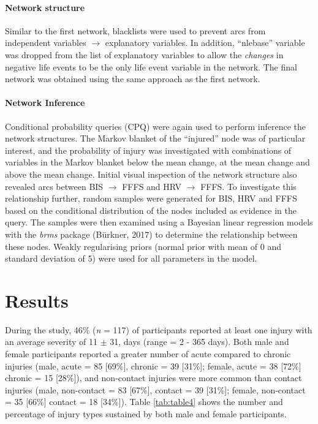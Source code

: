\documentclass[
  english,
  man,floatsintext]{apa6}
\let\oldparagraph\paragraph
\renewcommand{\paragraph}[1]{\oldparagraph{#1}\mbox{}}
\begin{document}
\hypertarget{network-structure-1}{%
\paragraph{Network structure}\label{network-structure-1}}

Similar to the first network, blacklists were used to prevent arcs from independent variables \(\rightarrow\) explanatory variables.
In addition, ``nlebase'' variable was dropped from the list of explanatory variables to allow the \emph{changes} in negative life events to be the only life event variable in the network.
The final network was obtained using the same approach as the first network.

\hypertarget{network-inference-1}{%
\paragraph{Network Inference}\label{network-inference-1}}

Conditional probability queries (CPQ) were again used to perform inference the network structures.
The Markov blanket of the ``injured'' node was of particular interest, and the probability of injury was investigated with combinations of variables in the Markov blanket below the mean change, at the mean change and above the mean change.
Initial visual inspection of the network structure also revealed arcs between BIS \(\rightarrow\) FFFS and HRV \(\rightarrow\) FFFS.
To investigate this relationship further, random samples were generated for BIS, HRV and FFFS based on the conditional distribution of the nodes included as evidence in the query.
The samples were then examined using a Bayesian linear regression models with the \emph{brms} package (Bürkner, 2017) to determine the relationship between these nodes.
Weakly regularising priors (normal prior with mean of 0 and standard deviation of 5) were used for all parameters in the model.

\hypertarget{results}{%
\section{Results}\label{results}}

During the study, 46\% (\emph{n} = 117) of participants reported at least one injury with an average severity of 11 \(\pm\) 31, days (range = 2 - 365 days).
Both male and female participants reported a greater number of acute compared to chronic injuries (male, acute = 85 {[}69\%{]}, chronic = 39 {[}31\%{]}; female, acute = 38 {[}72\%{]} chronic = 15 {[}28\%{]}), and non-contact injuries were more common than contact injuries (male, non-contact = 83 {[}67\%{]}, contact = 39 {[}31\%{]}; female, non-contact = 35 {[}66\%{]} contact = 18 {[}34\%{]}).
Table \ref{tab:table4} shows the number and percentage of injury types sustained by both male and female participants.
\end{document}
